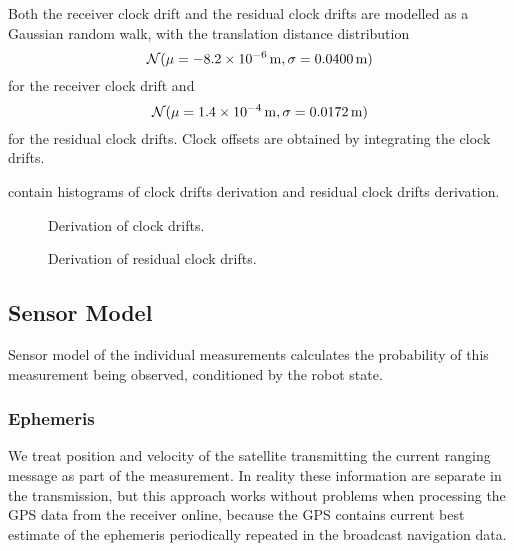 Both the receiver clock drift and the residual clock drifts are modelled as a Gaussian random walk,
with the translation distance distribution
\begin{equation}
\operatorname{\mathcal{N}}(\mu = \SI{-8.2e-06}{\meter}, \sigma = \SI{0.0400}{\meter})
\end{equation}
for the receiver clock drift and 
\begin{equation}
\operatorname{\mathcal{N}}(\mu = \SI{1.4e-4}{\meter}, \sigma = \SI{0.0172}{\meter})
\end{equation}
for the residual clock drifts.
Clock offsets are obtained by integrating the clock drifts.

contain histograms of clock drifts derivation and residual
clock drifts derivation.

\begin{figure}[htp]
	\centering
	\caption{Derivation of clock drifts.}
	\label{fig:clock-drift-derivation}
\end{figure}

\begin{figure}[htp]
	\centering
	\caption{Derivation of residual clock drifts.}
	\label{fig:residual-clock-drift-derivation}
\end{figure}


\subsection{Sensor Model}
Sensor model of the individual measurements calculates the probability of this
measurement being observed, conditioned by the robot state.

\subsubsection{Ephemeris}
We treat position and velocity of the satellite transmitting
the current ranging message as part of the measurement.
In reality these information are separate in the transmission, but
this approach works without problems when processing the GPS data from the receiver online,
because the GPS contains current best estimate of the ephemeris periodically repeated
in the broadcast navigation data.


